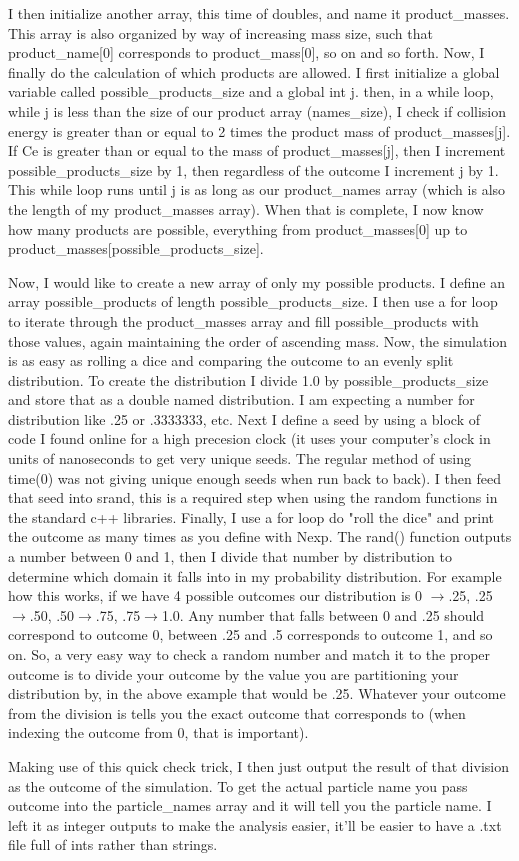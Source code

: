 \documentclass[11pt]{article}
\begin{document}
I then initialize another array, this time of doubles, and name it product\_masses. This array is also organized by way of increasing mass size, such that product\_name[0] corresponds to product\_mass[0], so on and so forth. Now, I finally do the calculation of which products are allowed. I first initialize a global variable called possible\_products\_size and a global int j. then, in a while loop, while j is less than the size of our product array (names\_size), I check if collision energy is greater than or equal to 2 times the product mass of product\_masses[j]. If Ce is greater than or equal to the mass of product\_masses[j], then I increment possible\_products\_size by 1, then regardless of the outcome I increment j by 1. This while loop runs until j is as long as our product\_names array (which is also the length of my product\_masses array). When that is complete, I now know how many products are possible, everything from product\_masses[0] up to product\_masses[possible\_products\_size]. 

Now, I would like to create a new array of only my possible products. I define an array possible\_products of length possible\_products\_size. I then use a for loop to iterate through the product\_masses array and fill possible\_products with those values, again maintaining the order of ascending mass. Now, the simulation is as easy as rolling a dice and comparing the outcome to an evenly split distribution. To create the distribution I divide 1.0 by possible\_products\_size and store that as a double named distribution. I am expecting a number for distribution like .25 or .3333333, etc. Next I define a seed by using a block of code I found online for a high precesion clock (it uses your computer's clock in units of nanoseconds to get very unique seeds. The regular method of using time(0) was not giving unique enough seeds when run back to back). I then feed that seed into srand, this is a required step when using the random functions in the standard c++ libraries. Finally, I use a for loop do "roll the dice" and print the outcome as many times as you define with Nexp. The rand() function outputs a number between 0 and 1, then I divide that number by distribution to determine which domain it falls into in my probability distribution. For example how this works, if we have 4 possible outcomes our distribution is 0 $\rightarrow$.25, .25$\rightarrow$.50, .50$\rightarrow$.75, .75$\rightarrow$1.0. Any number that falls between 0 and .25 should correspond to outcome 0, between .25 and .5 corresponds to outcome 1, and so on. So, a very easy way to check a random number and match it to the proper outcome is to divide your outcome by the value you are partitioning your distribution by, in the above example that would be .25. Whatever your outcome from the division is tells you the exact outcome that corresponds to (when indexing the outcome from 0, that is important). 

Making use of this quick check trick, I then just output the result of that division as the outcome of the simulation. To get the actual particle name you pass outcome into the particle\_names array and it will tell you the particle name. I left it as integer outputs to make the analysis easier, it'll be easier to have a .txt file full of ints rather than strings. 
\end{document}
